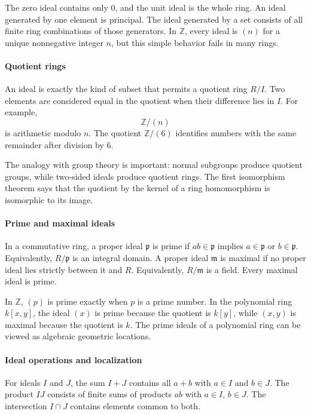 The zero ideal contains only $0$, and the unit ideal is the whole ring. An ideal generated by one element is principal. The ideal generated by a set consists of all finite ring combinations of those generators. In $\mathbb Z$, every ideal is $(n)$ for a unique nonnegative integer $n$, but this simple behavior fails in many rings.

\paragraph{Quotient rings}
An ideal is exactly the kind of subset that permits a quotient ring $R/I$. Two elements are considered equal in the quotient when their difference lies in $I$. For example,
\[
\mathbb Z/(n)
\]
is arithmetic modulo $n$. The quotient $\mathbb Z/(6)$ identifies numbers with the same remainder after division by $6$.

The analogy with group theory is important: normal subgroups produce quotient groups, while two-sided ideals produce quotient rings. The first isomorphism theorem says that the quotient by the kernel of a ring homomorphism is isomorphic to its image.

\paragraph{Prime and maximal ideals}
In a commutative ring, a proper ideal $\mathfrak p$ is prime if $ab\in\mathfrak p$ implies $a\in\mathfrak p$ or $b\in\mathfrak p$. Equivalently, $R/\mathfrak p$ is an integral domain. A proper ideal $\mathfrak m$ is maximal if no proper ideal lies strictly between it and $R$. Equivalently, $R/\mathfrak m$ is a field. Every maximal ideal is prime.

In $\mathbb Z$, $(p)$ is prime exactly when $p$ is a prime number. In the polynomial ring $k[x,y]$, the ideal $(x)$ is prime because the quotient is $k[y]$, while $(x,y)$ is maximal because the quotient is $k$. The prime ideals of a polynomial ring can be viewed as algebraic geometric locations.

\paragraph{Ideal operations and localization}
For ideals $I$ and $J$, the sum $I+J$ contains all $a+b$ with $a\in I$ and $b\in J$. The product $IJ$ consists of finite sums of products $ab$ with $a\in I$, $b\in J$. The intersection $I\cap J$ contains elements common to both.


